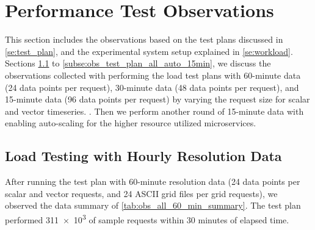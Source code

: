 \section{Performance Test Observations}
\label{se:observations}

This section includes the observations based on the test plans discussed in \cref{se:test_plan}, and the experimental system setup explained in \cref{se:workload}. Sections \ref{subse:obs_test_plan_all_60min} to \ref{subse:obs_test_plan_all_auto_15min}, we discuss the observations collected with performing the load test plans with 60-minute data (24 data points per request), 30-minute data (48 data points per request), and 15-minute data (96 data points per request) by varying the request size for scalar and vector timeseries. . Then we perform another round of 15-minute data with enabling auto-scaling for the higher resource utilized microservices.

\subsection{Load Testing with Hourly Resolution Data}
\label{subse:obs_test_plan_all_60min}

After running the test plan with 60-minute resolution data (24 data points per scalar and vector requests, and 24 ASCII grid files per grid requests), we observed the data summary of \cref{tab:obs_all_60_min_summary}. The test plan performed \num{311e3} of sample requests within 30 minutes of elapsed time.


